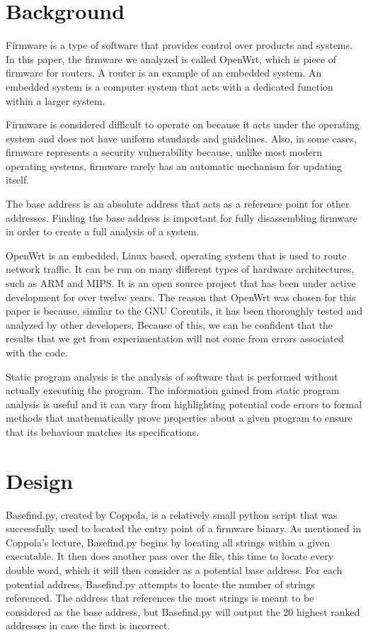 \documentclass[letterpaper,twocolumn,10pt]{article}
\begin{document}
\section{Background}
Firmware is a type of software that provides control over products and systems. In this paper, the firmware we analyzed is called OpenWrt, which is piece of firmware for routers. A router is an example of an embedded system. An embedded system is a computer system that acts with a dedicated function within a larger system.               

Firmware is considered difficult to operate on because it acts under the operating system and does not have uniform standards and guidelines. Also, in some cases, firmware represents a security vulnerability because, unlike most modern operating systems, firmware rarely has an automatic mechanism for updating itself\cite{firmwaresecurity2014}. 

The base address is an absolute address that acts as a reference point for other addresses. Finding the base address is important for fully disassembling firmware in order to create a full analysis of a system. 

OpenWrt is an embedded, Linux based, operating system that is used to route network traffic. It can be run on many different types of hardware architectures, such as ARM and MIPS. It is an open source project that has been under active development for over twelve years. The reason that OpenWrt was chosen for this paper is because, similar to the GNU Coreutils, it has been thoroughly tested and analyzed by other developers. Because of this, we can be confident that the results that we get from experimentation will not come from errors associated with the code. 

Static program analysis is the analysis of software that is performed without actually executing the program. The information gained from static program analysis is useful and it can vary from highlighting potential code errors to formal methods that mathematically prove properties about a given program to ensure that its behaviour matches its specifications.

\section{Design}
Basefind.py, created by Coppola\cite{cloudscale2013}, is a relatively small python script that was successfully used to located the entry point of a firmware binary. As mentioned in Coppola's lecture, Basefind.py begins by locating all strings within a given executable. It then does another pass over the file, this time to locate every double word, which it will then consider as a potential base address. For each potential address, Basefind.py attempts to locate the number of strings referenced. The address that references the most strings is meant to be considered as the base address, but Basefind.py will output the 20 highest ranked addresses in case the first is incorrect. 
\end{document}
